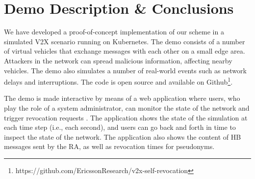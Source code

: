 \documentclass[conference]{IEEEtran}
\begin{document}

\section{Demo Description \& Conclusions}

We have developed a proof-of-concept implementation of our scheme in a simulated
\ac{V2X} scenario running on Kubernetes. The demo consists of a number of
virtual vehicles that exchange messages with each other on a small edge area.
Attackers in the network can spread malicious information, affecting nearby
vehicles. The demo also simulates a number of real-world events such as network
delays and interruptions. The code is open source and available on
Github\footnote{https://github.com/EricssonResearch/v2x-self-revocation}.

The demo is made interactive by means of a web application where users, who play
the role of a system administrator, can monitor the state of the network and
trigger revocation requests%
. The application shows the state of the simulation at each time step (i.e.,
each second), and users can go back and forth in time to inspect the state of
the network. The application also shows the content of \ac{HB}
messages sent by the \ac{RA}, as well as revocation times for pseudonyms.

\end{document}
